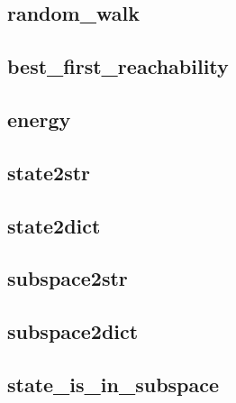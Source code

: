 \documentclass[letterpaper,10pt,english]{sphinxmanual}
\begin{document}
\subsection{random\_walk}
\label{\detokenize{StateTransitionGraphs:id6}}\label{\detokenize{StateTransitionGraphs:random-walk}}

\subsection{best\_first\_reachability}
\label{\detokenize{StateTransitionGraphs:id7}}\label{\detokenize{StateTransitionGraphs:best-first-reachability}}

\subsection{energy}
\label{\detokenize{StateTransitionGraphs:energy}}\label{\detokenize{StateTransitionGraphs:id8}}

\subsection{state2str}
\label{\detokenize{StateTransitionGraphs:state2str}}\label{\detokenize{StateTransitionGraphs:id9}}

\subsection{state2dict}
\label{\detokenize{StateTransitionGraphs:id10}}\label{\detokenize{StateTransitionGraphs:state2dict}}

\subsection{subspace2str}
\label{\detokenize{StateTransitionGraphs:id11}}\label{\detokenize{StateTransitionGraphs:subspace2str}}

\subsection{subspace2dict}
\label{\detokenize{StateTransitionGraphs:id12}}\label{\detokenize{StateTransitionGraphs:subspace2dict}}

\subsection{state\_is\_in\_subspace}
\label{\detokenize{StateTransitionGraphs:id13}}\label{\detokenize{StateTransitionGraphs:state-is-in-subspace}}
\end{document}
